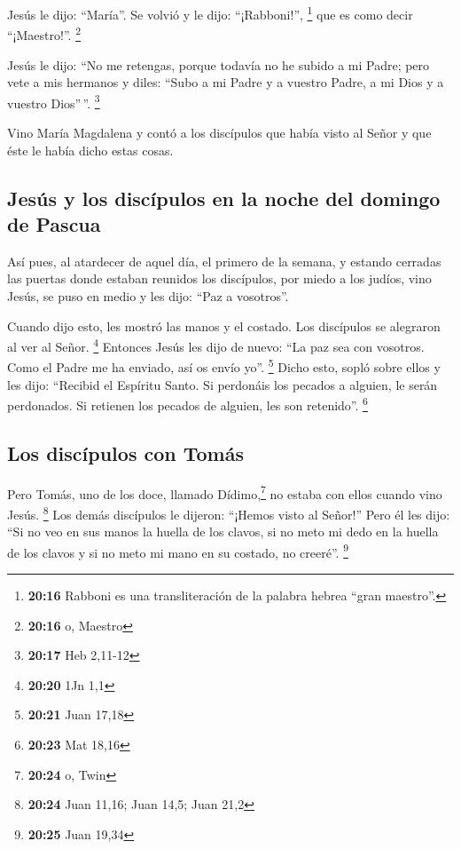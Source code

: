  Jesús le dijo: ``María''. Se volvió y le dijo:
``¡Rabboni!'', \footnote{\textbf{20:16} Rabboni es una transliteración
  de la palabra hebrea ``gran maestro''.} que es como decir
``¡Maestro!''. \footnote{\textbf{20:16} o, Maestro}

 Jesús le dijo: ``No me retengas, porque todavía no he
subido a mi Padre; pero vete a mis hermanos y diles: ``Subo a mi Padre y
a vuestro Padre, a mi Dios y a vuestro Dios''\,''. \footnote{\textbf{20:17}
  Heb 2,11-12}

 Vino María Magdalena y contó a los discípulos que había
visto al Señor y que éste le había dicho estas cosas.

\hypertarget{jesuxfas-y-los-discuxedpulos-en-la-noche-del-domingo-de-pascua}{%
\subsection{Jesús y los discípulos en la noche del domingo de
Pascua}\label{jesuxfas-y-los-discuxedpulos-en-la-noche-del-domingo-de-pascua}}

 Así pues, al atardecer de aquel día, el primero de la
semana, y estando cerradas las puertas donde estaban reunidos los
discípulos, por miedo a los judíos, vino Jesús, se puso en medio y les
dijo: ``Paz a vosotros''.

 Cuando dijo esto, les mostró las manos y el costado. Los
discípulos se alegraron al ver al Señor. \footnote{\textbf{20:20} 1Jn
  1,1}  Entonces Jesús les dijo de nuevo: ``La paz sea
con vosotros. Como el Padre me ha enviado, así os envío yo''.
\footnote{\textbf{20:21} Juan 17,18}  Dicho esto, sopló
sobre ellos y les dijo: ``Recibid el Espíritu Santo.  Si
perdonáis los pecados a alguien, le serán perdonados. Si retienen los
pecados de alguien, les son retenido''. \footnote{\textbf{20:23} Mat
  18,16}

\hypertarget{los-discuxedpulos-con-tomuxe1s}{%
\subsection{Los discípulos con
Tomás}\label{los-discuxedpulos-con-tomuxe1s}}

 Pero Tomás, uno de los doce, llamado Dídimo,\footnote{\textbf{20:24}
  o, Twin} no estaba con ellos cuando vino Jesús. \footnote{\textbf{20:24}
  Juan 11,16; Juan 14,5; Juan 21,2}  Los demás discípulos
le dijeron: ``¡Hemos visto al Señor!'' Pero él les dijo: ``Si no veo en
sus manos la huella de los clavos, si no meto mi dedo en la huella de
los clavos y si no meto mi mano en su costado, no creeré''. \footnote{\textbf{20:25}
  Juan 19,34}

